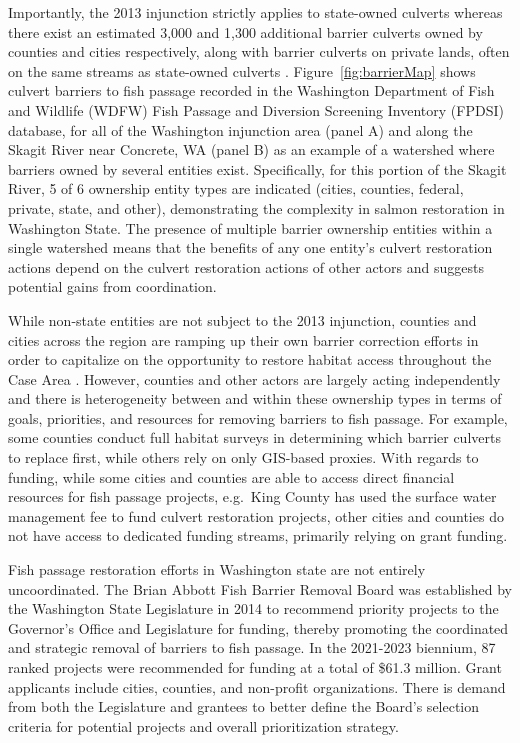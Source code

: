 \documentclass[12pt]{elsarticle}
\begin{document}
Importantly, the 2013 injunction strictly applies to state-owned culverts whereas there exist an estimated 3,000 and 1,300 additional barrier culverts owned by counties and cities respectively, along with barrier culverts on private lands, often on the same streams as state-owned culverts \citep{brown_coming_2019}. Figure~\ref{fig:barrierMap} shows culvert barriers to fish passage recorded in the Washington Department of Fish and Wildlife (WDFW) Fish Passage and Diversion Screening Inventory (FPDSI) database, for all of the Washington injunction area (panel A) and along the Skagit River near Concrete, WA (panel B) as an example of a watershed where barriers owned by several entities exist. Specifically, for this portion of the Skagit River, 5 of 6 ownership entity types are indicated (cities, counties, federal, private, state, and other), demonstrating the complexity in salmon restoration in Washington State. The presence of multiple barrier ownership entities within a single watershed means that the benefits of any one entity's culvert restoration actions depend on the culvert restoration actions of other actors and suggests potential gains from coordination. 

While non-state entities are not subject to the 2013 injunction, counties and cities across the region are ramping up their own barrier correction efforts in order to capitalize on the opportunity to restore habitat access throughout the Case Area \citep{brown_coming_2019}. However, counties and other actors are largely acting independently and there is heterogeneity between and within these ownership types in terms of goals, priorities, and resources for removing barriers to fish passage. For example, some counties conduct full habitat surveys in determining which barrier culverts to replace first, while others rely on only GIS-based proxies. With regards to funding, while some cities and counties are able to access direct financial resources for fish passage projects, e.g.\ King County has used the surface water management fee to fund culvert restoration projects, other cities and counties do not have access to dedicated funding streams, primarily relying on grant funding.  

Fish passage restoration efforts in Washington state are not entirely uncoordinated. The Brian Abbott Fish Barrier Removal Board was established by the Washington State Legislature in 2014 to recommend priority projects to the Governor's Office and Legislature for funding, thereby promoting the coordinated and strategic removal of barriers to fish passage. In the 2021-2023 biennium, 87 ranked projects were recommended for funding at a total of \$61.3 million. Grant applicants include cities, counties, and non-profit organizations. There is demand from both the Legislature and grantees to better define the Board's selection criteria for potential projects and overall prioritization strategy. 
\end{document}
